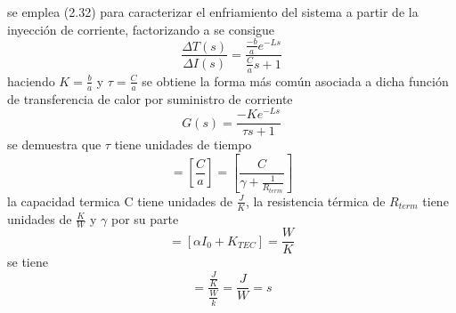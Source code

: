 se emplea (2.32) para caracterizar  el enfriamiento del sistema a partir de la inyección de corriente, factorizando a se consigue 
\begin{equation}
     \frac{\Delta T(s)}{\Delta I(s)} = \frac{\frac{-b}{a}e^{-Ls}}{\frac{C}{a} s + 1}
\end{equation}
haciendo $K=\frac{b}{a} $ y $\tau=\frac{C}{a}$ se obtiene la forma  más común asociada a dicha función de transferencia de calor por suministro  de corriente  
\begin{equation}
      G(s)= \frac{-Ke^{-Ls}}{\tau s +1}
\end{equation}
se demuestra que $\tau$ tiene unidades de tiempo
\begin{equation}
    [\tau] = [\frac{C}{a}] = [\frac{C}{\gamma+\frac{1}{R_{term}}} ]
\end{equation}
la capacidad termica C tiene unidades de $\frac{J}{K}$, la resistencia térmica de $R_{term}$ tiene unidades de $\frac{K}{W}$ y $\gamma$ por su parte 
\begin{equation}
    [\gamma] = [\alpha I_{0} + K_{TEC}] = \frac{W}{K}
\end{equation}
se tiene  
\begin{equation}
    [\tau] = \frac{\frac{J}{K}}{\frac{W}{k}}=\frac{J}{W} = s
\end{equation}
